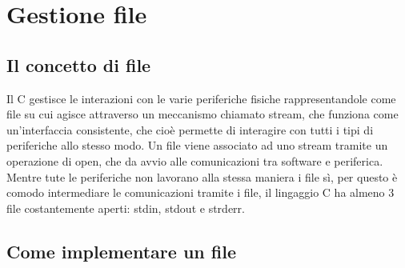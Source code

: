 \chapter{Gestione file}
\section{Il concetto di file}
Il C gestisce le interazioni con le varie periferiche fisiche rappresentandole come file su cui agisce attraverso un meccanismo chiamato stream, che funziona come un'interfaccia consistente, che cioè permette di interagire con tutti i tipi di periferiche allo stesso modo. Un file viene associato ad uno stream tramite un operazione di open, che da avvio alle comunicazioni tra software e periferica.\\ Mentre tute le periferiche non lavorano alla stessa maniera i file sì, per questo è comodo intermediare le comunicazioni tramite i file, il lingaggio C ha almeno 3 file costantemente aperti: stdin, stdout e strderr.\\
\section{Come implementare un file}

